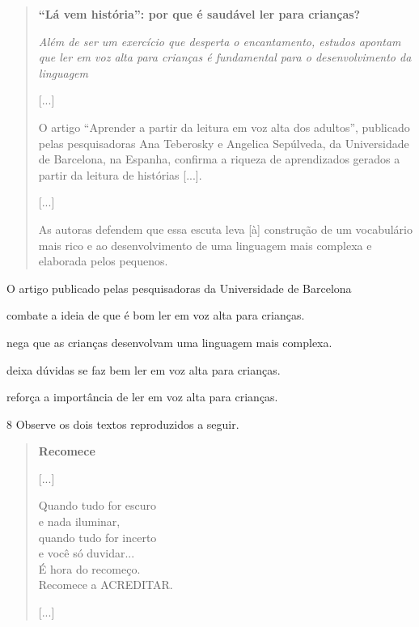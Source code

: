 \begin{quote}
\textbf{``Lá vem história'': por que é saudável ler para crianças?}

\emph{Além de ser um exercício que desperta o encantamento, estudos
apontam que ler em voz alta para crianças é fundamental para o
desenvolvimento da linguagem}

{[}...{]}

O artigo ``Aprender a partir da leitura em voz alta dos adultos'',
publicado pelas pesquisadoras Ana Teberosky e Angelica Sepúlveda, da
Universidade de Barcelona, na Espanha, confirma a riqueza de
aprendizados gerados a partir da leitura de histórias {[}...{]}.

{[}...{]}

As autoras defendem que essa escuta leva {[}à{]} construção de um
vocabulário mais rico e ao desenvolvimento de uma linguagem mais
complexa e elaborada pelos pequenos.

\end{quote}

O artigo publicado pelas pesquisadoras da Universidade de Barcelona

\begin{escolha}
\item combate a ideia de que é bom ler em voz alta para crianças.

\item nega que as crianças desenvolvam uma linguagem mais complexa.

\item deixa dúvidas se faz bem ler em voz alta para crianças.

\item reforça a importância de ler em voz alta para crianças.
\end{escolha}


\num{8} Observe os dois textos reproduzidos a seguir.

\begin{verse}
\textbf{Recomece}

{[}...{]}

Quando tudo for escuro\\
e nada iluminar,\\
quando tudo for incerto\\
e você só duvidar...\\
É hora do recomeço.\\
Recomece a ACREDITAR.

{[}...{]}

\end{verse}

